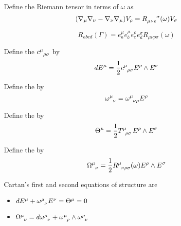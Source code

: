 \documentclass{article}
\begin{document}
\begin{definition}
Define the Riemann tensor in terms of $\omega$ as 
\[
(\nabla_\mu \nabla_\nu - \nabla_\nu \nabla_\mu ) V_\rho = R\indices{_\mu_\nu_\rho^\sigma}(\omega) V_\sigma
\]
\end{definition}

\begin{theorem}
\[
R_{abcd}(\Gamma) = e^\mu_a e^\mu_b e^\rho_c e^\sigma_d R_{\mu\nu\rho\sigma}(\omega)
\]
\end{theorem}

\begin{definition}
Define the  $c\indices{^\mu_\rho_\sigma}$ by 
\[
dE^\mu = \frac{1}{2} c\indices{^\mu_\rho_\sigma} E^\rho \wedge E^\sigma
\]
\end{definition}

\begin{definition}
Define the  by 
\[
\omega\indices{^\mu_\nu} = \omega\indices{^\mu_\nu_\rho}E^\rho
\]
\end{definition}

\begin{definition}
Define the  by 
\[
\Theta^\mu = \frac{1}{2} T\indices{^\mu_\rho_\sigma} E^\rho \wedge E^\sigma
\]
\end{definition}

\begin{definition}
Define the  by 
\[
\Omega\indices{^\mu_\nu} = \frac{1}{2} R\indices{^\mu_\nu_\rho_\sigma}(\omega) E^\rho \wedge E^\sigma
\]
\end{definition}

\begin{theorem}
Cartan's first and second equations of structure are 
\begin{itemize}
    \item $dE^\mu +  \omega\indices{^\mu_\nu} E^\nu = \Theta^\mu = 0 $ 
    \item $\Omega\indices{^\mu_\nu} = d\omega\indices{^\mu_\nu} +  \omega\indices{^\mu_\rho} \wedge  \omega\indices{^\rho_\nu}$
\end{itemize}
\end{theorem}
\end{document}
